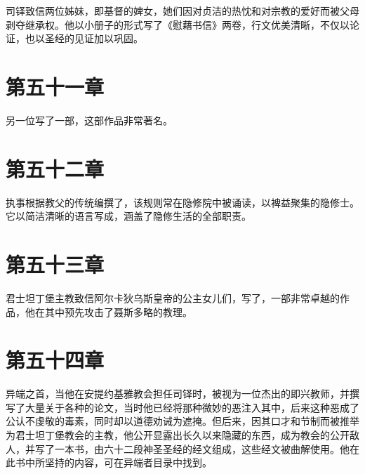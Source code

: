 司铎致信两位姊妹，即基督的婢女，她们因对贞洁的热忱和对宗教的爱好而被父母剥夺继承权。他以小册子的形式写了《慰藉书信》两卷，行文优美清晰，不仅以论证，也以圣经的见证加以巩固。\par


\section{第五十一章}

另一位写了一部，这部作品非常著名。\par


\section{第五十二章}

执事根据教父的传统编撰了，该规则常在隐修院中被诵读，以裨益聚集的隐修士。它以简洁清晰的语言写成，涵盖了隐修生活的全部职责。\par


\section{第五十三章}

君士坦丁堡主教致信阿尔卡狄乌斯皇帝的公主女儿们，写了，一部非常卓越的作品，他在其中预先攻击了聂斯多略的教理。\par


\section{第五十四章}

异端之首，当他在安提约基雅教会担任司铎时，被视为一位杰出的即兴教师，并撰写了大量关于各种的论文，当时他已经将那种微妙的恶注入其中，后来这种恶成了公认不虔敬的毒素，同时却以道德劝诫为遮掩。但后来，因其口才和节制而被推举为君士坦丁堡教会的主教，他公开显露出长久以来隐藏的东西，成为教会的公开敌人，并写了一本书，由六十二段神圣圣经的经文组成，这些经文被曲解使用。他在此书中所坚持的内容，可在异端者目录中找到。\par

